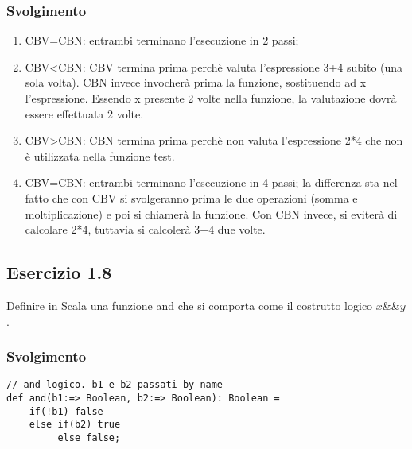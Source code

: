 \subsubsection*{Svolgimento}
\begin{enumerate}
	\item CBV=CBN: entrambi terminano l'esecuzione in 2 passi; 
	\item CBV<CBN: CBV termina prima perchè valuta l'espressione 3+4 subito (una sola volta). CBN invece invocherà prima la funzione, sostituendo ad x l'espressione. Essendo x presente 2 volte nella funzione, la valutazione dovrà essere effettuata 2 volte. 
	\item CBV>CBN: CBN termina prima perchè non valuta l'espressione 2*4 che non è utilizzata nella funzione test.
	\item CBV=CBN: entrambi terminano l'esecuzione in 4 passi; la differenza sta nel fatto che con CBV si svolgeranno prima le due operazioni (somma e moltiplicazione) e poi si chiamerà la funzione. Con CBN invece, si eviterà di calcolare 2*4, tuttavia si calcolerà 3+4 due volte.
\end{enumerate}



\subsection*{Esercizio 1.8}
Definire in Scala una funzione and che si comporta come il costrutto logico $x\&\&y$. 

\subsubsection*{Svolgimento}

\begin{lstlisting}
// and logico. b1 e b2 passati by-name 
def and(b1:=> Boolean, b2:=> Boolean): Boolean =
	if(!b1) false
	else if(b2) true
		 else false; 
\end{lstlisting}












